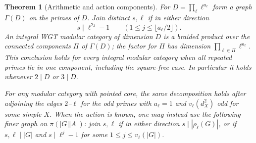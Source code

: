 \documentclass[11pt,a4paper]{article}
\numberwithin{equation}{section}
\newtheorem{theorem}{Theorem}[section]
\theoremstyle{remark}
\begin{document}
\begin{theorem}[Arithmetic and action components]\label{fam:M:13.3}\label{thm:uc-components}
For $D=\prod_\ell\ell^{a_\ell}$ form a graph $\Gamma(D)$ on the
primes of $D$. Join distinct $s,\ell$ if in either direction
\[
        s\mid\ell^{2j}-1\qquad (1\le j\le\lfloor a_\ell/2\rfloor).
\]
An integral WGT modular category of dimension $D$ is a braided
product over the connected components $\Pi$ of $\Gamma(D)$;
the factor for $\Pi$ has dimension $\prod_{\ell\in\Pi}\ell^{a_\ell}$.
This conclusion holds for every integral modular category when all
repeated primes lie in one component, including the square-free case.
In particular it holds whenever $2\mid D$ or $3\mid D$.

For any modular category with pointed core, the same decomposition
holds after adjoining the edges $2$--$\ell$ for the odd primes
with $a_\ell=1$ and $v_\ell(d_X^2)$ odd for some simple $X$.
When the action is known, one may instead use the following finer
graph on $\pi(|G||A|)$: join $s,\ell$ if in either direction
$s\mid |\rho_\ell(G)|$, or if $s,\ell\mid |G|$ and
$s\mid\ell^j-1$ for some $1\le j\le v_\ell(|G|)$.
\end{theorem}
\end{document}
